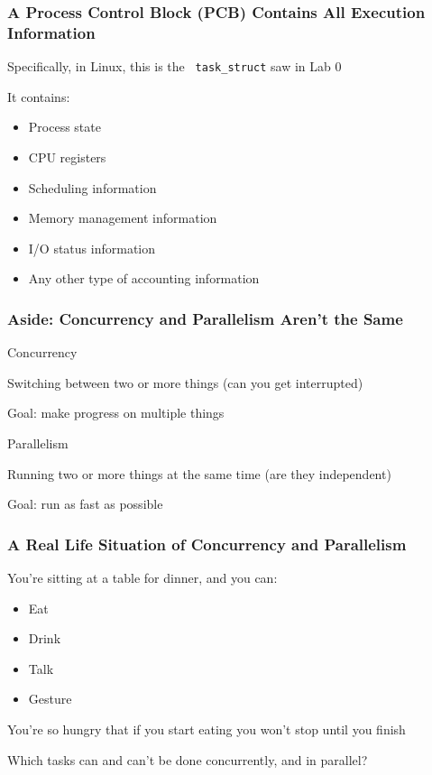   \begin{frame}
    \frametitle{A Process Control Block (PCB) Contains All Execution Information}


    Specifically, in Linux, this is the \texttt{\color{primarycolor}
    task\_struct} saw in Lab 0

    \vspace{2em}

    It contains:
    \begin{itemize}
      \item Process state
      \item CPU registers
      \item Scheduling information
      \item Memory management information
      \item I/O status information
      \item Any other type of accounting information
    \end{itemize}
  \end{frame}

  \begin{frame}
    \frametitle{Aside: Concurrency and Parallelism Aren't the Same}

    Concurrency

    \hspace{2em} Switching between two or more things (can you get interrupted)

    \hspace{4em} Goal: make progress on multiple things

    \vspace{4em}

    Parallelism

    \hspace{2em} Running two or more things at the same time (are they independent)

    \hspace{4em} Goal: run as fast as possible
  \end{frame}

  \begin{frame}
    \frametitle{A Real Life Situation of Concurrency and Parallelism}


    You're sitting at a table for dinner, and you can:
    \begin{itemize}
      \item Eat
      \item Drink
      \item Talk
      \item Gesture
    \end{itemize}
    You're so hungry that if you start eating you won't stop until you finish

    \vspace{4em}

    Which tasks can and can't be done concurrently, and in parallel?
  \end{frame}


